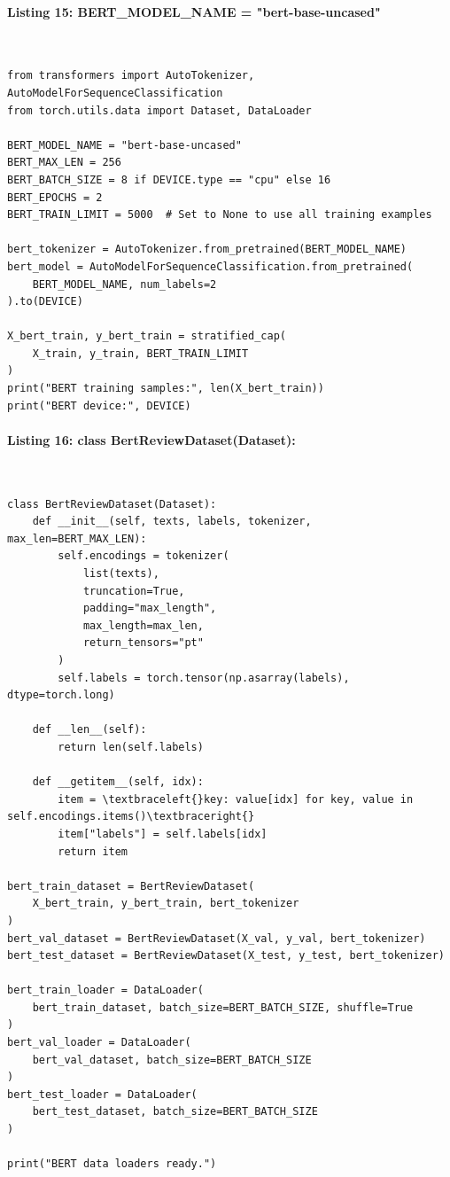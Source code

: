 \documentclass[12pt,a4paper,oneside]{report}
\begin{document}
\paragraph{Listing 15: BERT\_MODEL\_NAME = "bert-base-uncased"}\mbox{}\\[-1ex]
\begin{Verbatim}[commandchars=\\\{\},breaklines=true,breakanywhere=true,fontsize=\scriptsize,frame=leftline,framesep=2mm,rulecolor=\color{gray}]
from transformers import AutoTokenizer, AutoModelForSequenceClassification
from torch.utils.data import Dataset, DataLoader

BERT_MODEL_NAME = "bert-base-uncased"
BERT_MAX_LEN = 256
BERT_BATCH_SIZE = 8 if DEVICE.type == "cpu" else 16
BERT_EPOCHS = 2
BERT_TRAIN_LIMIT = 5000  # Set to None to use all training examples

bert_tokenizer = AutoTokenizer.from_pretrained(BERT_MODEL_NAME)
bert_model = AutoModelForSequenceClassification.from_pretrained(
    BERT_MODEL_NAME, num_labels=2
).to(DEVICE)

X_bert_train, y_bert_train = stratified_cap(
    X_train, y_train, BERT_TRAIN_LIMIT
)
print("BERT training samples:", len(X_bert_train))
print("BERT device:", DEVICE)
\end{Verbatim}
\paragraph{Listing 16: class BertReviewDataset(Dataset):}\mbox{}\\[-1ex]
\begin{Verbatim}[commandchars=\\\{\},breaklines=true,breakanywhere=true,fontsize=\scriptsize,frame=leftline,framesep=2mm,rulecolor=\color{gray}]
class BertReviewDataset(Dataset):
    def __init__(self, texts, labels, tokenizer, max_len=BERT_MAX_LEN):
        self.encodings = tokenizer(
            list(texts),
            truncation=True,
            padding="max_length",
            max_length=max_len,
            return_tensors="pt"
        )
        self.labels = torch.tensor(np.asarray(labels), dtype=torch.long)

    def __len__(self):
        return len(self.labels)

    def __getitem__(self, idx):
        item = \textbraceleft{}key: value[idx] for key, value in self.encodings.items()\textbraceright{}
        item["labels"] = self.labels[idx]
        return item

bert_train_dataset = BertReviewDataset(
    X_bert_train, y_bert_train, bert_tokenizer
)
bert_val_dataset = BertReviewDataset(X_val, y_val, bert_tokenizer)
bert_test_dataset = BertReviewDataset(X_test, y_test, bert_tokenizer)

bert_train_loader = DataLoader(
    bert_train_dataset, batch_size=BERT_BATCH_SIZE, shuffle=True
)
bert_val_loader = DataLoader(
    bert_val_dataset, batch_size=BERT_BATCH_SIZE
)
bert_test_loader = DataLoader(
    bert_test_dataset, batch_size=BERT_BATCH_SIZE
)

print("BERT data loaders ready.")
\end{Verbatim}
\end{document}
